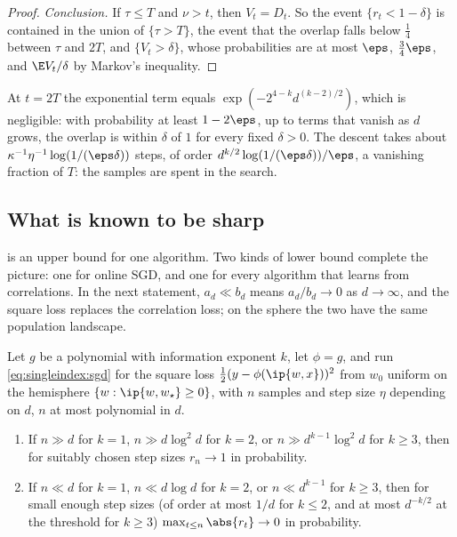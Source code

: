 \begin{refsection}
\begin{proof}
\emph{Conclusion.} If $\tau\le T$ and $\nu>t$, then $V_t=D_t$. So the event $\{r_t<1-\delta\}$ is contained in the union of $\{\tau>T\}$, the event that the overlap falls below $\frac14$ between $\tau$ and $2T$, and $\{V_t>\delta\}$, whose probabilities are at most $\eps$, $\frac34\eps$, and $\E V_t/\delta$ by Markov's inequality.
\end{proof}

At $t=2T$ the exponential term equals $\exp(-2^{4-k}d^{(k-2)/2})$, which is negligible: with probability at least $1-2\eps$, up to terms that vanish as $d$ grows, the overlap is within $\delta$ of $1$ for every fixed $\delta>0$. The descent takes about $\kappa^{-1}\eta^{-1}\log(1/(\eps\delta))$ steps, of order $d^{k/2}\log(1/(\eps\delta))/\eps$, a vanishing fraction of $T$: the samples are spent in the search.

\subsection{What is known to be sharp}\label{sec:singleindex:sharp}

 is an upper bound for one algorithm. Two kinds of lower bound complete the picture: one for online SGD, and one for every algorithm that learns from correlations. In the next statement, $a_d\ll b_d$ means $a_d/b_d\to0$ as $d\to\infty$, and the square loss replaces the correlation loss; on the sphere the two have the same population landscape.

\begin{theorem}\label{thm:singleindex:bagj}
Let $g$ be a polynomial with information exponent $k$, let $\phi=g$, and run \eqref{eq:singleindex:sgd} for the square loss $\frac12(y-\phi(\ip{w,x}))^2$ from $w_0$ uniform on the hemisphere $\{w:\ip{w,w_\star}\ge0\}$, with $n$ samples and step size $\eta$ depending on $d$, $n$ at most polynomial in $d$.
\begin{enumerate}
\item[\textup{(a)}] If $n\gg d$ for $k=1$, $n\gg d\log^2d$ for $k=2$, or $n\gg d^{k-1}\log^2d$ for $k\ge3$, then for suitably chosen step sizes $r_n\to1$ in probability.
\item[\textup{(b)}] If $n\ll d$ for $k=1$, $n\ll d\log d$ for $k=2$, or $n\ll d^{k-1}$ for $k\ge3$, then for small enough step sizes (of order at most $1/d$ for $k\le2$, and at most $d^{-k/2}$ at the threshold for $k\ge3$) $\max_{t\le n}\abs{r_t}\to0$ in probability.
\end{enumerate}
\end{theorem}


\end{refsection}
